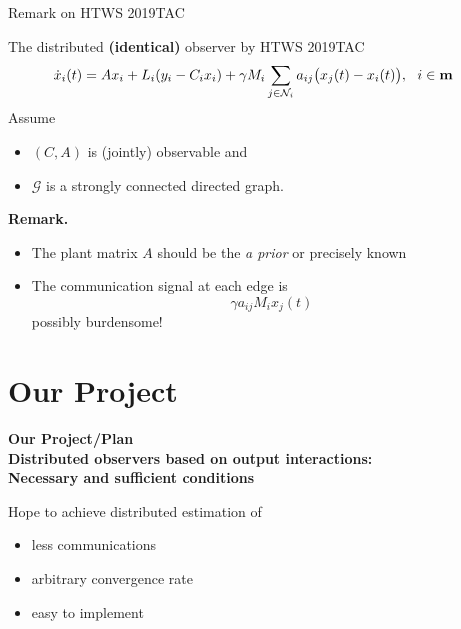 \documentclass{beamer}
\begin{document}
\begin{frame}{\color{blue} Remark on HTWS 2019TAC}

The distributed \textbf{(identical)} observer by HTWS 2019TAC
\begin{align*}
\dot{x}_{i}(t)&=A x_{i} +L_{i}(y_{i}-C_{i}x_{i})+\gamma M_{i} \sum_{j\in\mathcal{N}_{i}} a_{ij}\big(x_{j}(t)-x_{i}(t) \big),~~ i\in{\bf m}
\end{align*}
Assume
\begin{itemize}
  \item $(C,A)$ is (jointly) observable and
  \item $\mathcal{G}$ is a strongly connected directed graph.
\end{itemize}

{\color{red}\bf Remark.}
\begin{itemize}
  \item The plant matrix $A$ should be the \emph{a prior} or precisely known
  \item The communication signal at each edge is
\begin{equation*}
\gamma a_{ij} M_{i} x_{j}(t)
\end{equation*}
possibly burdensome!
\end{itemize}


\end{frame}





\section{Our Project}%

\begin{frame}
\thispagestyle{empty}

\begin{center}
{\Large\bf\color{blue}Our Project/Plan \\
{\small  Distributed observers based on output interactions: \\ Necessary and sufficient conditions} }
\end{center}

Hope to achieve distributed estimation of
\begin{itemize}
  \item less communications
  \item arbitrary convergence rate
  \item easy to implement
\end{itemize}

\end{frame}
\end{document}
